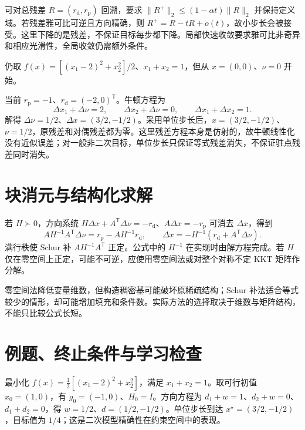 \documentclass[UTF8,12pt,a4paper,fontset=fandol]{ctexbook}
\begin{document}
可对总残差 $R=(r_{\mathrm d},r_{\mathrm p})$ 回溯，要求 $\|R^+\|_2\leq(1-\alpha t)\|R\|_2$ 并保持定义域。若残差雅可比可逆且方向精确，则 $R^+=R-tR+o(t)$，故小步长会被接受。这里下降的是残差，不保证目标每步都下降。局部快速收敛要求雅可比非奇异和相应光滑性，全局收敛仍需额外条件。

\begin{example}[从不可行点同时修正两个残差]
仍取 $f(x)=[(x_1-2)^2+x_2^2]/2$、$x_1+x_2=1$，但从 $x=(0,0)$、$\nu=0$ 开始。
\end{example}
\begin{solve}
当前 $r_{\mathrm p}=-1$、$r_{\mathrm d}=(-2,0)^{\mathsf T}$。牛顿方程为
\[
 \Delta x_1+\Delta\nu=2,\qquad
 \Delta x_2+\Delta\nu=0,\qquad
 \Delta x_1+\Delta x_2=1.
\]
解得 $\Delta\nu=1/2$、$\Delta x=(3/2,-1/2)$。采用单位步长后，$x=(3/2,-1/2)$、$\nu=1/2$，原残差和对偶残差都为零。这里残差方程本身是仿射的，故牛顿线性化没有近似误差；对一般非二次目标，单位步长只保证等式残差消失，不保证驻点残差同时消失。
\end{solve}

\section{块消元与结构化求解}

若 $H\succ0$，方向系统 $H\Delta x+A^{\mathsf T}\Delta\nu=-r_{\mathrm d}$、$A\Delta x=-r_{\mathrm p}$ 可消去 $\Delta x$，得到
\[
 AH^{-1}A^{\mathsf T}\Delta\nu
 =r_{\mathrm p}-AH^{-1}r_{\mathrm d},\qquad
 \Delta x=-H^{-1}(r_{\mathrm d}+A^{\mathsf T}\Delta\nu).
\]
满行秩使 Schur 补 $AH^{-1}A^{\mathsf T}$ 正定。公式中的 $H^{-1}$ 在实现时由解方程完成。若 $H$ 仅在零空间上正定，可能不可逆，应使用零空间法或对整个对称不定 KKT 矩阵作分解。

零空间法降低变量维数，但构造稠密基可能破坏原稀疏结构；Schur 补法适合等式较少的情形，却可能增加填充和条件数。实际方法的选择取决于维数与矩阵结构，不能只比较公式长短。

\section{例题、终止条件与学习检查}
\begin{example}[守恒约束下的一步牛顿]
最小化 $f(x)=\tfrac12[(x_1-2)^2+x_2^2]$，满足 $x_1+x_2=1$。取可行初值 $x_0=(1,0)$，有 $g_0=(-1,0)$、$H_0=I$。方向方程为 $d_1+w=1$、$d_2+w=0$、$d_1+d_2=0$，得 $w=1/2$、$d=(1/2,-1/2)$。单位步长到达 $x^\star=(3/2,-1/2)$，目标值为 $1/4$；这是二次模型精确性在约束空间中的表现。
\end{example}
\end{document}
